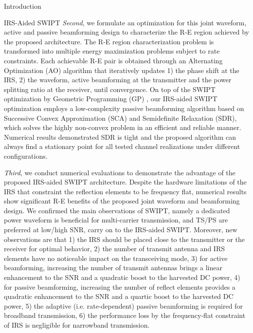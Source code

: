 \documentclass[journal]{IEEEtran}
\begin{document}
\begin{section}{Introduction}
\begin{subsection}{IRS-Aided SWIPT}
			\textit{Second}, we formulate an optimization for this joint waveform, active and passive beamforming design to characterize the R-E region achieved by the proposed architecture. The R-E region characterization problem is transformed into multiple energy maximization problems subject to rate constraints. Each achievable R-E pair is obtained through an Alternating Optimization (AO) algorithm that iteratively updates 1) the phase shift at the IRS, 2) the waveform, active beamforming at the transmitter and the power splitting ratio at the receiver, until convergence. On top of the SWIPT optimization by Geometric Programming (GP) \cite{Clerckx2018b}, our IRS-aided SWIPT optimization employs a low-complexity passive beamforming algorithm based on Successive Convex Approximation (SCA) and Semidefinite Relaxation (SDR), which solves the highly non-convex problem in an efficient and reliable manner. Numerical results demonstrated SDR is tight and the proposed algorithm can always find a stationary point for all tested channel realizations under different configurations.

			\textit{Third}, we conduct numerical evaluations to demonstrate the advantage of the proposed IRS-aided SWIPT architecture.
			Despite the hardware limitations of the IRS that constraint the reflection elements to be frequency flat, numerical results show significant R-E benefits of the proposed joint waveform and beamforming design. We confirmed the main observations of SWIPT, namely a dedicated power waveform is beneficial for multi-carrier transmission, and TS/PS are preferred at low/high SNR, carry on to the IRS-aided SWIPT. Moreover, new observations are that 1) the IRS should be placed close to the transmitter or the receiver for optimal behavior, 2) the number of transmit antenna and IRS elements have no noticeable impact on the transceiving mode, 3) for active beamforming, increasing the number of transmit antennas brings a linear enhancement to the SNR and a quadratic boost to the harvested DC power, 4) for passive beamforming, increasing the number of reflect elements provides a quadratic enhancement to the SNR and a quartic boost to the harvested DC power, 5) the adaptive (i.e. rate-dependent) passive beamforming is required for broadband transmission, 6) the performance loss by the frequency-flat constraint of IRS is negligible for narrowband transmission.


\end{subsection}
\end{section}
\end{document}
